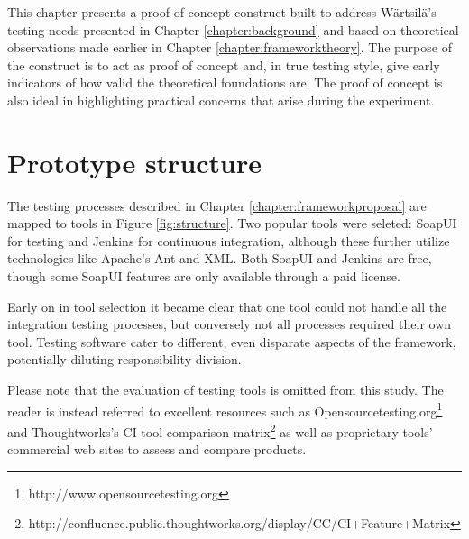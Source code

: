 \documentclass[12pt,a4paper,oneside,pdftex]{report}
\begin{document}
{%
This chapter presents a proof of concept construct built to address Wärtsilä's testing needs presented in Chapter \ref{chapter:background} and based on theoretical observations made earlier in Chapter \ref{chapter:frameworktheory}. The purpose of the construct is to act as proof of concept and, in true testing style, give early indicators of how valid the theoretical foundations are. The proof of concept is also ideal in highlighting practical concerns that arise during the experiment.

\section{Prototype structure}

The testing processes described in Chapter \ref{chapter:frameworkproposal} are mapped to tools in Figure \ref{fig:structure}. Two popular tools were seleted: SoapUI for testing and Jenkins for continuous integration, although these further utilize technologies like Apache's Ant and XML. Both SoapUI and Jenkins are free, though some SoapUI features are only available through a paid license.

Early on in tool selection it became clear that one tool could not handle all the integration testing processes, but conversely not all processes required their own tool. Testing software cater to different, even disparate aspects of the framework, potentially diluting responsibility division.

Please note that the evaluation of testing tools is omitted from this study. The reader is instead referred to excellent resources such as Opensourcetesting.org\footnote{http://www.opensourcetesting.org} and Thoughtworks's CI tool comparison matrix\footnote{http://confluence.public.thoughtworks.org/display/CC/CI+Feature+Matrix} as well as proprietary tools' commercial web sites to assess and compare products.

\begin{figure}[H]
\centering
\end{figure}}
\end{document}
